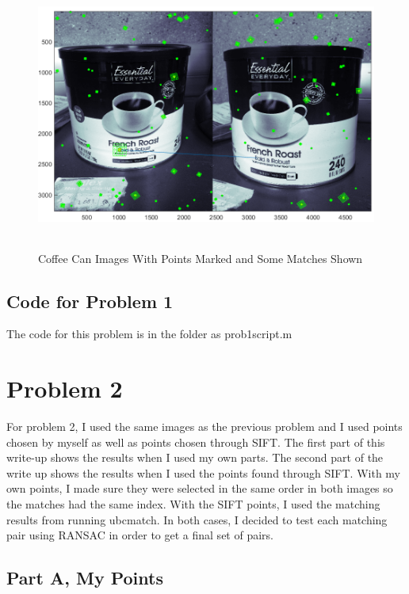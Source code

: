 \documentclass[11pt,psfig]{article}
\begin{document}
\begin{figure}[H]
\centering
\includegraphics[height=3.5in]{coffeeCan_pointsWithMatching.png}
\caption{Coffee Can Images With Points Marked and Some Matches Shown}
\label{cc3}
\end{figure}

\subsection*{Code for Problem 1}

The code for this problem is in the folder as prob1script.m

\newpage

\section*{Problem 2}

For problem 2, I used the same images as the previous problem and I used points chosen by myself as well as points chosen through SIFT. The first part of this write-up shows the results when I used my own parts. The second part of the write up shows the results when I used the points found through SIFT. With my own points, I made sure they were selected in the same order in both images so the matches had the same index. With the SIFT points, I used the matching results from running ubcmatch. In both cases, I decided to test each matching pair using RANSAC in order to get a final set of pairs. 

\subsection*{Part A, My Points}
\end{document}
